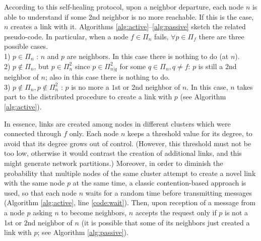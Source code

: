 \documentclass[10pt, conference, compsocconf]{IEEEtran}
\begin{document}
According to this self-healing protocol, upon a neighbor departure, each node $n$ is able to understand if some 2nd neighbor is no more reachable. 
If this is the case, $n$ creates a link with it.
Algorithms \ref{alg:active}--\ref{alg:passive} sketch the related pseudo-code.
In particular, when a node $f \in \Pi_n$ fails, $\forall p \in \Pi_f$ there are three possible cases.\\
1) $p \in \Pi_n$ : $n$ and $p$ are neighbors. In this case there is nothing to do (at $n$).\\
2) $p \notin \Pi_n$, but $p \in \Pi^2_n$ since $p \in \Pi^2_{n|q}$ for some $q \in \Pi_n, q \neq f$: $p$ is still a 2nd neighbor of $n$; also in this case there is nothing to do.\\
3) $p \notin \Pi_n, p \notin \Pi^2_n$ : $p$ is no more a $1$st or 2nd neighbor of $n$. In this case, $n$ takes part to the distributed procedure to create a link with $p$ (see Algorithm \ref{alg:active}).

In essence, links are created among nodes in different clusters which were connected through $f$ only.
Each node $n$ keeps a threshold value for its degree, to avoid that its degree grows out of control. (However, this threshold must not be too low, otherwise it would contrast the creation of additional links, and this might generate network partitions.)
Moreover, in order to diminish the probability that multiple nodes of the same cluster attempt to create a novel link with the same node $p$ at the same time, a classic contention-based approach is used, so that each node $n$ waits for a random time before transmitting messages (Algorithm \ref{alg:active}, line \ref{code:wait}). 
Then, upon reception of a message from a node $p$ asking $n$ to become neighbors, $n$ accepts the request only if $p$ is not a 1st or 2nd neighbor of $n$ (it is possible that some of its neighbors just created a link with $p$; see Algorithm \ref{alg:passive}).
\end{document}
